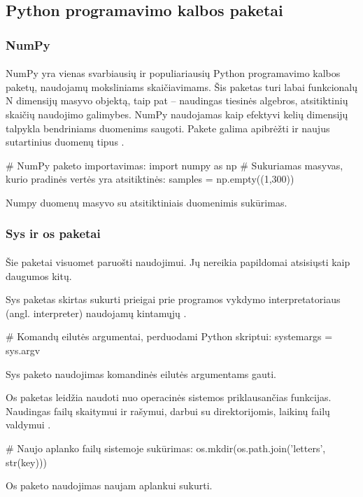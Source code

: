 \documentclass[a4paper,12pt]{article}
\begin{document}
\subsection{Python programavimo kalbos paketai}
\subsubsection{NumPy}
\paragraph{} NumPy yra vienas svarbiausių ir populiariausių Python programavimo kalbos paketų, naudojamų moksliniams skaičiavimams. Šis paketas turi labai funkcionalų N dimensijų masyvo objektą, taip pat – naudingas tiesinės algebros, atsitiktinių skaičių naudojimo galimybes. NumPy naudojamas kaip efektyvi kelių dimensijų talpykla bendriniams duomenims saugoti. Pakete galima apibrėžti ir naujus sutartinius duomenų tipus \cite{NUMPY}.
	\begin{listing}[H]
		\begin{pythoncode}
# NumPy paketo importavimas:
import numpy as np
# Sukuriamas masyvas, kurio pradinės vertės yra atsitiktinės:
samples =  np.empty((1,300))
		\end{pythoncode}
		\caption{Numpy duomenų masyvo su atsitiktiniais duomenimis sukūrimas.}		
	\end{listing}


\subsubsection{Sys ir os paketai}
\paragraph{} Šie paketai visuomet paruošti naudojimui. Jų nereikia papildomai atsisiųsti kaip daugumos kitų.

Sys paketas skirtas sukurti prieigai prie programos vykdymo interpretatoriaus (angl. interpreter) naudojamų kintamųjų \cite{SYS}.
	\begin{listing}[H]
		\begin{pythoncode}
# Komandų eilutės argumentai, perduodami Python skriptui:
systemargs = sys.argv
		\end{pythoncode}
		\caption{Sys paketo naudojimas komandinės eilutės argumentams gauti.}	
	\end{listing}

Os paketas leidžia naudoti nuo operacinės sistemos priklausančias funkcijas. Naudingas failų skaitymui ir rašymui, darbui su direktorijomis, laikinų failų valdymui \cite{OS}.
	\begin{listing}[H]
		\begin{pythoncode}
# Naujo aplanko failų sistemoje sukūrimas:
os.mkdir(os.path.join('letters', str(key)))
		\end{pythoncode}
		\caption{Os paketo naudojimas naujam aplankui sukurti.}	
	\end{listing}
	
\end{document}
